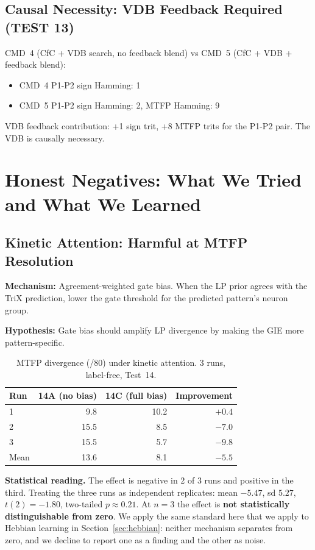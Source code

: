 \documentclass[11pt,letterpaper]{article}
\begin{document}
\subsection{Causal Necessity: VDB Feedback Required (TEST 13)}

CMD~4 (CfC + VDB search, no feedback blend) vs CMD~5 (CfC + VDB + feedback blend):
\begin{itemize}
\item CMD~4 P1-P2 sign Hamming: 1
\item CMD~5 P1-P2 sign Hamming: 2, MTFP Hamming: 9
\end{itemize}

VDB feedback contribution: +1 sign trit, +8 MTFP trits for the P1-P2 pair. The VDB is causally necessary.

\section{Honest Negatives: What We Tried and What We Learned}

\subsection{Kinetic Attention: Harmful at MTFP Resolution}

\textbf{Mechanism:} Agreement-weighted gate bias. When the LP prior agrees with the TriX prediction, lower the gate threshold for the predicted pattern's neuron group.

\textbf{Hypothesis:} Gate bias should amplify LP divergence by making the GIE more pattern-specific.

\begin{table}[h]
\centering
\begin{tabular}{l rrr}
\toprule
Run & 14A (no bias) & 14C (full bias) & Improvement \\
\midrule
1 & 9.8 & 10.2 & $+0.4$ \\
2 & 15.5 & 8.5 & $\mathbf{-7.0}$ \\
3 & 15.5 & 5.7 & $\mathbf{-9.8}$ \\
\midrule
Mean & 13.6 & 8.1 & $\mathbf{-5.5}$ \\
\bottomrule
\end{tabular}
\caption{MTFP divergence (/80) under kinetic attention. 3 runs, label-free, Test~14.}
\label{tab:kinetic}
\end{table}

\textbf{Statistical reading.} The effect is negative in 2 of 3 runs and positive in the third. Treating the three runs as independent replicates: mean $-5.47$, sd $5.27$, $t(2) = -1.80$, two-tailed $p \approx 0.21$. At $n=3$ the effect is \textbf{not statistically distinguishable from zero}. We apply the same standard here that we apply to Hebbian learning in Section~\ref{sec:hebbian}: neither mechanism separates from zero, and we decline to report one as a finding and the other as noise.
\end{document}
